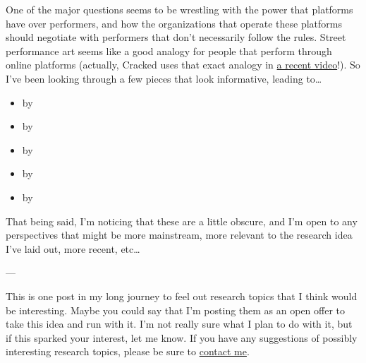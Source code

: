 \documentclass[11pt]{article}
\begin{document}
One of the major questions seems to be
wrestling with the power that platforms have over performers, and
how the organizations that operate these platforms should negotiate with
performers that don't necessarily follow the rules.
Street performance art seems like a good analogy for
people that perform through online platforms
(actually, Cracked uses that exact analogy in
\href{https://www.youtube.com/watch?v=_MIPQNa8uhg}{a recent video}!).
So I've been looking through a few pieces that look informative,
leading to\dots
\begin{itemize}
  \item {} by \citeauthor{harrison1990drawing}~\cite{harrison1990drawing}
  \item {} by \citeauthor{cohen1998radical}~\cite{cohen1998radical}
  \item {} by \citeauthor{groemer2016street}~\cite{groemer2016street}
  \item {} by \citeauthor{osorio2009teatro}~\cite{osorio2009teatro}
  \item {} by \citeauthor{mason1992street}~\cite{mason1992street}
\end{itemize}

That being said, I'm noticing that these are a little obscure, and
I'm open to any perspectives that might be
more mainstream,
more relevant to the research idea I've laid out,
more recent,
etc\dots

---

This is one post in my long journey to feel out research topics that I think would be interesting.
Maybe you could say that I'm posting them as an open offer to take this idea and run with it.
I'm not really sure what I plan to do with it, but
if this sparked your interest, let me know.
If you have any suggestions of possibly interesting research topics,
please be sure to \href{https://ali-alkhatib.com/contact}{contact me}.

\printbibliography{}
\end{document}
